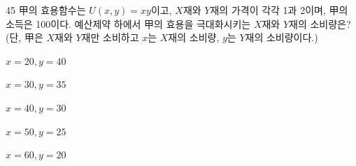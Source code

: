 \begin{question}{45}
甲의 효용함수는 $U(x,y)=xy$이고, $X$재와 $Y$재의 가격이 각각 1과 2이며, 甲의 소득은 100이다. 예산제약 하에서 甲의 효용을 극대화시키는 $X$재와 $Y$재의 소비량은? (단, 甲은 $X$재와 $Y$재만 소비하고 $x$는 $X$재의 소비량, $y$는 $Y$재의 소비량이다.)
\begin{choices}
  \item $x=20, y=40$
  \item $x=30, y=35$
  \item $x=40, y=30$
  \item $x=50, y=25$
  \item $x=60, y=20$
\end{choices}
\end{question}
